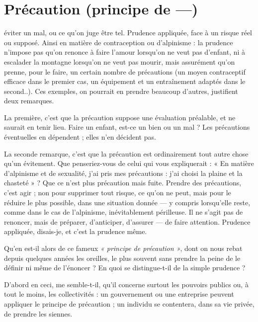 \section{Précaution (principe de —)}
éviter un mal, ou ce qu’on juge être tel.
Prudence appliquée, face à un risque réel ou supposé. Ainsi en matière de
contraception ou d’alpinisme : la prudence n’impose pas qu’on renonce à faire
l'amour lorsqu'on ne veut pas d’enfant, ni à escalader la montagne lorsqu'on ne
veut pas mourir, mais assurément qu'on prenne, pour le faire, un certain
nombre de précautions (un moyen contraceptif efficace dans le premier cas, un
équipement et un entraînement adaptés dans le second..). Ces exemples, on
pourrait en prendre beaucoup d’autres, justifient deux remarques.

La première, c’est que la précaution suppose une évaluation préalable, et ne
saurait en tenir lieu. Faire un enfant, est-ce un bien ou un mal ? Les précautions
éventuelles en dépendent ; elles n’en décident pas.

La seconde remarque, c’est que la précaution est ordinairement tout autre
chose qu’un évitement. Que penseriez-vous de celui qui vous expliquerait :
« En matière d’alpinisme et de sexualité, j'ai pris mes précautions : j'ai choisi la
plaine et la chasteté » ? Que ce n’est plus précaution mais fuite. Prendre des
précautions, c’est agir ; non pour supprimer tout risque, ce qu’on ne peut, mais
pour le réduire le plus possible, dans une situation donnée — y compris
lorsqu'elle reste, comme dans le cas de l’alpinisme, inévitablement périlleuse. Il
ne s’agit pas de renoncer, mais de préparer, d’anticiper, d’assurer — de faire
attention. Prudence appliquée, disais-je, et c’est la prudence même.

Qu'en est-il alors de ce fameux {\it « principe de précaution »}, dont on nous
rebat depuis quelques années les oreilles, le plus souvent sans prendre la peine
de le définir ni même de l’énoncer ? En quoi se distingue-t-il de la simple
prudence ?

D'abord en ceci, me semble-t-il, qu’il concerne surtout les pouvoirs publics
ou, à tout le moins, les collectivités : un gouvernement ou une entreprise peuvent
appliquer le principe de précaution ; un individu se contentera, dans sa vie
privée, de prendre les siennes.

